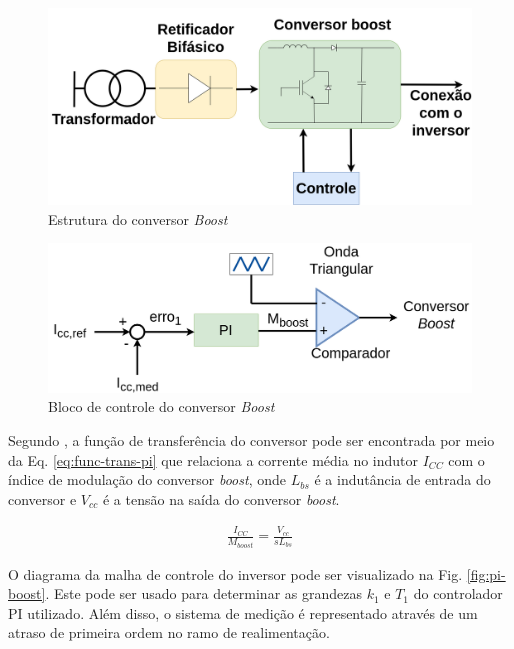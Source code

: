 \begin{figure}[!hbt]
	\begin{center}
		\includegraphics[scale=0.25]{figuras/estrutura_conversor_boost.png}
		\caption{Estrutura do conversor \textit{Boost}}
		\label{fig:estrutura-boost}
	\end{center}
\end{figure}

\begin{figure}[!hbt]
	\begin{center}
		\includegraphics[scale=0.25]{figuras/controle_boost.png}
		\caption{Bloco de controle do conversor \textit{Boost}}
		\label{fig:controle-boost}
	\end{center}
\end{figure}

Segundo \cite{TeseProfAlex}, a função de transferência do conversor pode ser encontrada por meio da 
Eq. \ref{eq:func-trans-pi} que relaciona a corrente média no indutor $I_{CC}$ com o índice de 
modulação do conversor \textit{boost}, onde $L_{bs}$ é a indutância de entrada do conversor e 
$V_{cc}$ é a tensão na saída do conversor \textit{boost}.

\begin{align}
	\frac{I_{CC}}{M_{boost}} = \frac{V_{cc}}{sL_{bs}}\label{eq:func-trans-pi}
\end{align}

O diagrama da malha de controle do inversor pode ser visualizado na Fig. \ref{fig:pi-boost}.
Este pode ser usado para determinar as grandezas $k_1$ e $T_1$ do controlador PI utilizado. 
Além disso, o sistema de medição é representado através de um atraso de primeira ordem no 
ramo de realimentação.

